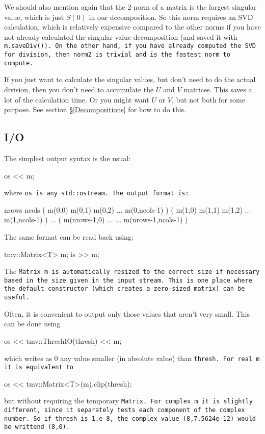 We should also mention again that the 2-norm of a matrix is the 
largest singular value, which is just $S(0)$ in our decomposition.
So this norm requires an SVD calculation, 
which is relatively expensive compared to the other norms
if you have not already calculated the singular value decomposition
(and saved it with \tt{m.saveDiv()}).  On the other hand, if you have already
computed the SVD for division, then \tt{norm2} is trivial and is the 
fastest norm to compute.

If you just want to calculate the singular values,
but don't need to do the actual division, then you don't need to 
accumulate the $U$ and $V$ matrices.  This saves a lot of the 
calculation time.  Or you might want $U$ or $V$, but not both for 
some purpose.  See section \S\ref{Decompositions} for how to do this.

\subsection{I/O}
\label{Matrix_IO}

The simplest output syntax is the usual:
\begin{tmvcode}
os << m;
\end{tmvcode}
where \tt{os} is any \tt{std::ostream}.
The output format is:
\begin{tmvcode}
nrows ncols
( m(0,0)  m(0,1)  m(0,2)  ...  m(0,ncols-1) )
( m(1,0)  m(1,1)  m(1,2)  ...  m(1,ncols-1) )
...
( m(nrows-1,0) ...  ...  m(nrows-1,ncols-1) )
\end{tmvcode}

The same format can be read back using:
\begin{tmvcode}
tmv::Matrix<T> m;
is >> m;
\end{tmvcode}
The \tt{Matrix m} is automatically resized to the correct size if necessary based in the size given in the input stream.  This is one place where the default constructor (which creates a zero-sized matrix) can be useful.

Often, it is convenient to output only those values that aren't very small. 
This can be done using
\begin{tmvcode}
os << tmv::ThreshIO(thresh) << m;
\end{tmvcode}
which writes as 0 any value smaller (in absolute value) than \tt{thresh}.  
For real \tt{m} it is equivalent to
\begin{tmvcode}
os << tmv::Matrix<T>(m).clip(thresh);
\end{tmvcode}
but without requiring the temporary \tt{Matrix}.  For complex \tt{m} it is slightly different, since it separately tests each component of the complex number.  So if \tt{thresh} is \tt{1.e-8}, the complex value \tt{(8,7.5624e-12)} would be writtend \tt{(8,0)}.

